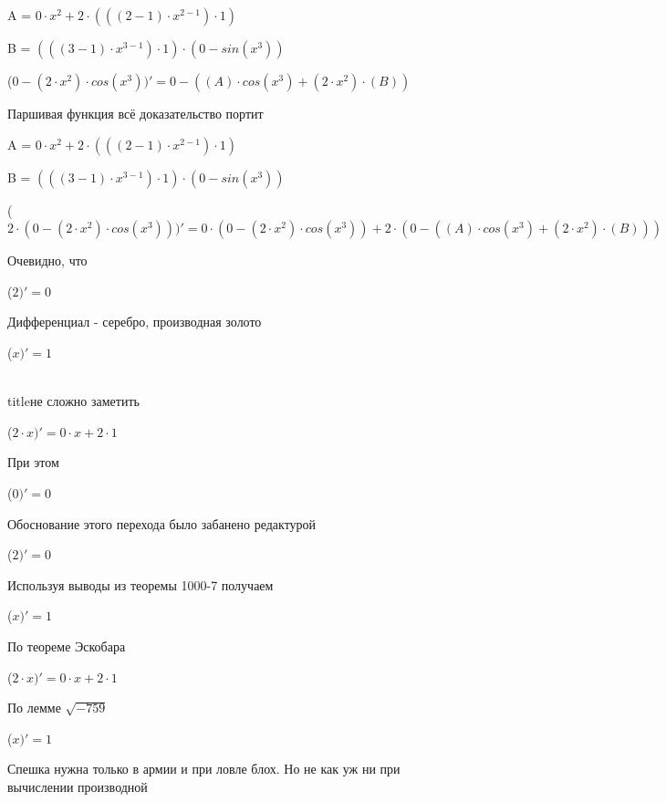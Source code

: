 \documentclass[12pt,a4paper,fleqn]{article}
\begin{document}
\begin{center}
A = $0 \cdot x^{2}+2 \cdot (((2-1) \cdot x^{2-1}) \cdot 1)$\end{center}
\begin{center}
B = $(((3-1) \cdot x^{3-1}) \cdot 1) \cdot (0-sin(x^{3}))$\end{center}
\begin{center}
 ($0-(2 \cdot x^{2}) \cdot cos(x^{3}))'
  = 0-((A) \cdot cos(x^{3})+(2 \cdot x^{2}) \cdot (B))$\end{center}
Паршивая функция всё доказательство портит\cite{link2}

\begin{center}
A = $0 \cdot x^{2}+2 \cdot (((2-1) \cdot x^{2-1}) \cdot 1)$\end{center}
\begin{center}
B = $(((3-1) \cdot x^{3-1}) \cdot 1) \cdot (0-sin(x^{3}))$\end{center}
\begin{center}
 ($2 \cdot (0-(2 \cdot x^{2}) \cdot cos(x^{3})))'
  = 0 \cdot (0-(2 \cdot x^{2}) \cdot cos(x^{3}))+2 \cdot (0-((A) \cdot cos(x^{3})+(2 \cdot x^{2}) \cdot (B)))$\end{center}
Очевидно, что

\begin{center}
 ($2)'
  = 0$\end{center}
Дифференциал - серебро, производная золото\cite{link2}

\begin{center}
 ($x)'
  = 1$\end{center}
\\ title{не сложно заметить} 

\begin{center}
 ($2 \cdot x)'
  = 0 \cdot x+2 \cdot 1$\end{center}
При этом

\begin{center}
 ($0)'
  = 0$\end{center}
Обоснование этого перехода было забанено редактурой

\begin{center}
 ($2)'
  = 0$\end{center}
Используя выводы из теоремы 1000-7 получаем

\begin{center}
 ($x)'
  = 1$\end{center}
По теореме Эскобара

\begin{center}
 ($2 \cdot x)'
  = 0 \cdot x+2 \cdot 1$\end{center}
По лемме $\sqrt{-759}$
\begin{center}
 ($x)'
  = 1$\end{center}
Спешка нужна только в армии и при ловле блох. Но не как уж ни при вычислении производной\cite{link2}
\end{document}
